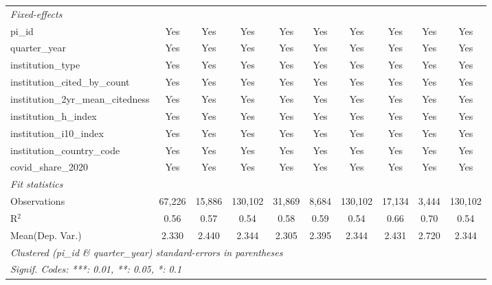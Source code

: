 \begin{tabular}{lccccccccc}
   \midrule
   \emph{Fixed-effects}\\
   pi\_id                                                      & Yes           & Yes           & Yes           & Yes          & Yes           & Yes           & Yes           & Yes            & Yes\\  
   quarter\_year                                               & Yes           & Yes           & Yes           & Yes          & Yes           & Yes           & Yes           & Yes            & Yes\\  
   institution\_type                                           & Yes           & Yes           & Yes           & Yes          & Yes           & Yes           & Yes           & Yes            & Yes\\  
   institution\_cited\_by\_count                               & Yes           & Yes           & Yes           & Yes          & Yes           & Yes           & Yes           & Yes            & Yes\\  
   institution\_2yr\_mean\_citedness                           & Yes           & Yes           & Yes           & Yes          & Yes           & Yes           & Yes           & Yes            & Yes\\  
   institution\_h\_index                                       & Yes           & Yes           & Yes           & Yes          & Yes           & Yes           & Yes           & Yes            & Yes\\  
   institution\_i10\_index                                     & Yes           & Yes           & Yes           & Yes          & Yes           & Yes           & Yes           & Yes            & Yes\\  
   institution\_country\_code                                  & Yes           & Yes           & Yes           & Yes          & Yes           & Yes           & Yes           & Yes            & Yes\\  
   covid\_share\_2020                                          & Yes           & Yes           & Yes           & Yes          & Yes           & Yes           & Yes           & Yes            & Yes\\  
   \midrule
   \emph{Fit statistics}\\
   Observations                                                & 67,226        & 15,886        & 130,102       & 31,869       & 8,684         & 130,102       & 17,134        & 3,444          & 130,102\\  
   R$^2$                                                       & 0.56          & 0.57          & 0.54          & 0.58         & 0.59          & 0.54          & 0.66          & 0.70           & 0.54\\  
Mean(Dep. Var.) & 2.330 & 2.440 & 2.344 & 2.305 & 2.395 & 2.344 & 2.431 & 2.720 & 2.344 \\
   \midrule \midrule
   \multicolumn{10}{l}{\emph{Clustered (pi\_id \& quarter\_year) standard-errors in parentheses}}\\
   \multicolumn{10}{l}{\emph{Signif. Codes: ***: 0.01, **: 0.05, *: 0.1}}\\
\end{tabular}
\par\endgroup
